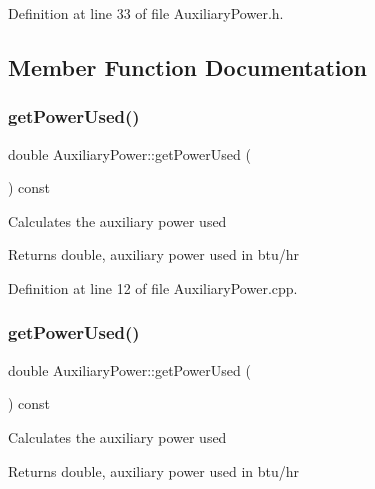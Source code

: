 Definition at line 33 of file Auxiliary\+Power.\+h.



\subsection{Member Function Documentation}
\mbox{\label{class_auxiliary_power_a824ece4e6bb789fceb1b55ecf2f678bd}} 
\subsubsection{\texorpdfstring{get\+Power\+Used()}{getPowerUsed()}\hspace{0.1cm}{\footnotesize\ttfamily [1/3]}}
{\footnotesize\ttfamily double Auxiliary\+Power\+::get\+Power\+Used (\begin{DoxyParamCaption}{ }\end{DoxyParamCaption}) const}

Calculates the auxiliary power used

\begin{DoxyReturn}{Returns}
double, auxiliary power used in btu/hr 
\end{DoxyReturn}


Definition at line 12 of file Auxiliary\+Power.\+cpp.

\mbox{\label{class_auxiliary_power_a824ece4e6bb789fceb1b55ecf2f678bd}} 
\subsubsection{\texorpdfstring{get\+Power\+Used()}{getPowerUsed()}\hspace{0.1cm}{\footnotesize\ttfamily [2/3]}}
{\footnotesize\ttfamily double Auxiliary\+Power\+::get\+Power\+Used (\begin{DoxyParamCaption}{ }\end{DoxyParamCaption}) const}

Calculates the auxiliary power used

\begin{DoxyReturn}{Returns}
double, auxiliary power used in btu/hr 
\end{DoxyReturn}
\mbox{\label{class_auxiliary_power_a824ece4e6bb789fceb1b55ecf2f678bd}} 
